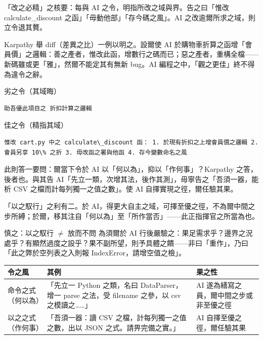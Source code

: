 「改之必精」之核要：每與 AI 之令，明指所改之域與界。告之曰「惟改 calculate\_discount 之函」「毋動他部」「存今碼之風」。AI 之改逾爾所求之域，則立令退其贅。

Karpathy 舉 diff（差異之比）一例以明之。設爾使 AI 於購物車折算之函增「會員價」之邏輯：善之產者，惟改此函，增數行之碼而已；惡之產者，重構全檔——新碼雖或更「雅」，然爾不能定其有無新 bug。AI 編程之中，「觀之更佳」終不得為違令之辭。

劣之令（其域晦）

\begin{lstlisting}
助吾優此項目之 折扣計算之邏輯
\end{lstlisting}

佳之令（精指其域）

\begin{lstlisting}
惟改 cart.py 中之 calculate\_discount 函： 1. 於現有折扣之上增會員價之邏輯 2. 會員另享 10\% 之折 3. 毋改函之署與他函 4. 存今變數命名之風
\end{lstlisting}


此則答一要問：爾當下令於 AI 以「何以為」，抑以「作何事」？Karpathy 之答，後者也。與其告 AI「先立一類，次增其法，後作其測」，毋寧告之「吾須一器，能析 CSV 之檔而計每列獨一之值之數」。使 AI 自擇實現之徑，爾任驗其果。

「以之馭行」之利有二。於 AI，得更大自主之域，可擇至優之徑，不為爾中間之步所縛；於爾，移其注自「何以為」至「所作當否」——此正指揮官之所當為也。

\begin{tcbwarn}{慎之：以之馭行 $\neq$ 放而不問}
為須爾於 AI 行後嚴驗之：果足需求乎？邊界之況處乎？有顯然過度之設乎？果不副所望，則予具體之饋——非曰「重作」，乃曰「此之弊於空列表之入則報 IndexError，請增空值之檢」。

\end{tcbwarn}

\begin{center}
\begin{tabularx}{\linewidth}{|X|X|X|}
\hline
\textbf{令之風} & \textbf{其例} & \textbf{果之性} \tabularnewline
\hline
命令之式（何以為） & 「先立一 Python 之類，名曰 DataParser，增一 parse 之法，受 filename 之參，以 csv 之模讀之……」 & AI 遂為繕寫之員，爾中間之步或非至優之徑 \tabularnewline
以之之式（作何事） & 「吾須一器：讀 CSV 之檔，計每列獨一之值之數，出以 JSON 之式。請畀完備之實。」 & AI 自擇至優之徑，爾任驗其果 \tabularnewline
\hline
\end{tabularx}
\end{center}

